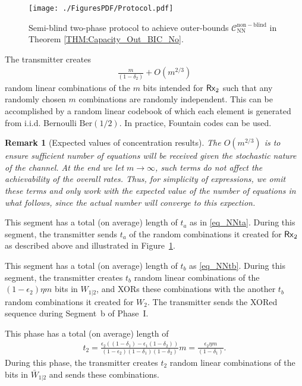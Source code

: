 \documentclass[journal,12pt,draftcls,onecolumn]{IEEEtran}
\newtheorem{remark}{Remark}
\begin{document}
\begin{figure}[!ht]
\centering
\texttt{[image: ./FiguresPDF/Protocol.pdf]}
\caption{Semi-blind two-phase protocol to achieve outer-bounds $\mathcal{C}^\mathrm{non-blind}_\mathrm{NN}$ in Theorem \ref{THM:Capacity_Out_BIC_No}.} \label{Fig:Protocol-BICN}
\end{figure}

 The transmitter creates
\begin{align}
\frac{m}{(1-\delta_2)} + O\left( m^{2/3} \right)
\end{align}
random linear combinations of the $m$ bits intended for ${\sf Rx}_2$ such that any randomly chosen $m$ combinations are randomly independent. This can be accomplished by a random linear codebook of which each element is generated from i.i.d. Bernoulli $\mathrm{Ber}(1/2)$. In practice, Fountain codes can be used.

\begin{remark}[Expected values of concentration results]
The $O\left( m^{2/3} \right)$ is to ensure sufficient number of equations will be received given the stochastic nature of the channel. At the end we let $m \rightarrow \infty$, such terms do not affect the achievability of the overall rates. Thus, for simplicity of expressions, we omit these terms and only work with the expected value of the number of equations in what follows, since the actual number will converge to this expection.
\end{remark}



 This segment has a total (on average) length of
$t_a$ as in \eqref{eq_NNta}. During this segment, the transmitter sends $t_a$ of the random combinations it created for ${\sf Rx}_2$ as described above and illustrated in Figure~\ref{Fig:Protocol-BICN}.

 This segment has a total (on average) length of
$t_b$ as \eqref{eq_NNtb}. During this segment, the transmitter creates $t_b$ random linear combinations of the $(1-\epsilon_2) \eta m$ bits in $W_{1|2}$, and XORs these combinations with the another $t_b$ random combinations it created for $W_2$. The transmitter sends the XORed sequence during Segment~b of Phase~I.


 This phase has a total (on average) length of
\begin{align}
t_2 = \frac{\epsilon_2\left( (1-\delta_1)-\epsilon_1(1-\delta_2) \right)}{(1-\epsilon_2)(1-\delta_1)(1-\delta_2)}m = \frac{\epsilon_2 \eta m}{(1-\delta_1)}. \label{eq_NNt2}
\end{align}
During this phase, the transmitter creates $t_2$ random linear combinations of the bits in $\bar{W}_{1|2}$ and sends these combinations.
\end{document}
